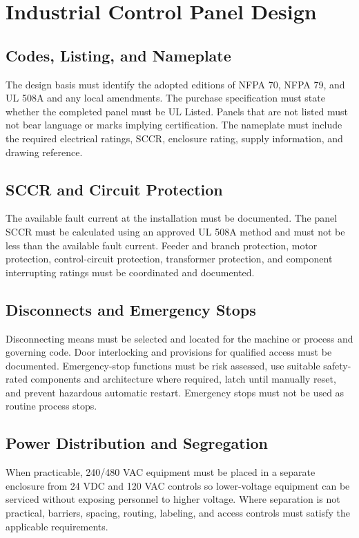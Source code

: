 \section{Industrial Control Panel Design}
\subsection{Codes, Listing, and Nameplate}
The design basis must identify the adopted editions of NFPA 70, NFPA 79, and UL 508A and any local amendments. The purchase specification must state whether the completed panel must be UL Listed. Panels that are not listed must not bear language or marks implying certification. The nameplate must include the required electrical ratings, SCCR, enclosure rating, supply information, and drawing reference.

\subsection{SCCR and Circuit Protection}
The available fault current at the installation must be documented. The panel SCCR must be calculated using an approved UL 508A method and must not be less than the available fault current. Feeder and branch protection, motor protection, control-circuit protection, transformer protection, and component interrupting ratings must be coordinated and documented.

\subsection{Disconnects and Emergency Stops}
Disconnecting means must be selected and located for the machine or process and governing code. Door interlocking and provisions for qualified access must be documented. Emergency-stop functions must be risk assessed, use suitable safety-rated components and architecture where required, latch until manually reset, and prevent hazardous automatic restart. Emergency stops must not be used as routine process stops.

\subsection{Power Distribution and Segregation}
When practicable, 240/480 VAC equipment must be placed in a separate enclosure from 24 VDC and 120 VAC controls so lower-voltage equipment can be serviced without exposing personnel to higher voltage. Where separation is not practical, barriers, spacing, routing, labeling, and access controls must satisfy the applicable requirements.

